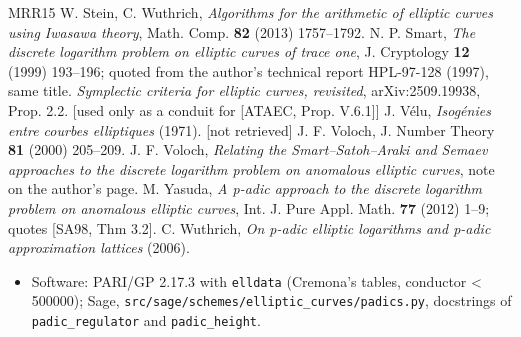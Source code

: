 \documentclass[11pt,a4paper]{article}
\theoremstyle{named}
\begin{document}
\begin{thebibliography}{MRR15}
 W. Stein, C. Wuthrich, \textit{Algorithms for the arithmetic of elliptic curves using Iwasawa theory}, Math. Comp. \textbf{82} (2013) 1757–1792.
 N. P. Smart, \textit{The discrete logarithm problem on elliptic curves of trace one}, J. Cryptology \textbf{12} (1999) 193–196; quoted from the author's technical report HPL-97-128 (1997), same title.
 \textit{Symplectic criteria for elliptic curves, revisited}, arXiv:2509.19938, Prop. 2.2. [used only as a conduit for [ATAEC, Prop. V.6.1]]
 J. Vélu, \textit{Isogénies entre courbes elliptiques} (1971). [not retrieved]
 J. F. Voloch, J. Number Theory \textbf{81} (2000) 205–209.
 J. F. Voloch, \textit{Relating the Smart–Satoh–Araki and Semaev approaches to the discrete logarithm problem on anomalous elliptic curves}, note on the author's page.
 M. Yasuda, \textit{A p-adic approach to the discrete logarithm problem on anomalous elliptic curves}, Int. J. Pure Appl. Math. \textbf{77} (2012) 1–9; quotes [SA98, Thm 3.2].
 C. Wuthrich, \textit{On p-adic elliptic logarithms and p-adic approximation lattices} (2006).
\begin{itemize}[leftmargin=1.4em,itemsep=.2em,topsep=.3em]
\item Software: PARI/GP 2.17.3 with \texttt{elldata} (Cremona's tables, conductor \textless{} 500000); Sage, \texttt{src/sage/schemes/elliptic\_\allowbreak{}curves/padics.\allowbreak{}py}, docstrings of \texttt{padic\_\allowbreak{}regulator} and \texttt{padic\_\allowbreak{}height}.
\end{itemize}

\end{thebibliography}
\end{document}
